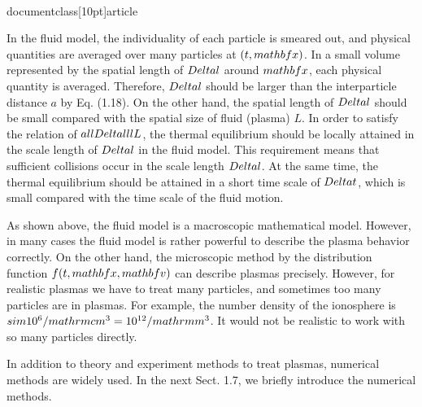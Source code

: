 \\documentclass[10pt]{article}
\begin{document}
In the fluid model, the individuality of each particle is smeared out, and physical quantities are averaged over many particles at $(t, \\mathbf{x})$. In a small volume represented by the spatial length of $\\Delta l$ around $\\mathbf{x}$, each physical quantity is averaged. Therefore, $\\Delta l$ should be larger than the interparticle distance $a$ by Eq. (1.18). On the other hand, the spatial length of $\\Delta l$ should be small compared with the spatial size of fluid (plasma) $L$. In order to satisfy the relation of $a \\ll \\Delta l \\ll L$, the thermal equilibrium should be locally attained in the scale length of $\\Delta l$ in the fluid model. This requirement means that sufficient collisions occur in the scale length $\\Delta l$. At the same time, the thermal equilibrium should be attained in a short time scale of $\\Delta t$, which is small compared with the time scale of the fluid motion.

As shown above, the fluid model is a macroscopic mathematical model. However, in many cases the fluid model is rather powerful to describe the plasma behavior correctly. On the other hand, the microscopic method by the distribution function $f(t, \\mathbf{x}, \\mathbf{v})$ can describe plasmas precisely. However, for realistic plasmas we have to treat many particles, and sometimes too many particles are in plasmas. For example, the number density of the ionosphere is $\\sim 10^{6} / \\mathrm{cm}^{3}=10^{12} / \\mathrm{m}^{3}$. It would not be realistic to work with so many particles directly.

In addition to theory and experiment methods to treat plasmas, numerical methods are widely used. In the next Sect. 1.7, we briefly introduce the numerical methods.
\end{document}
